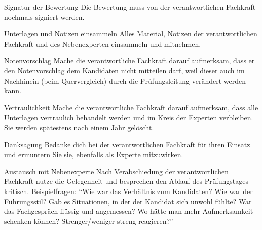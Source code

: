 \begin{taskitemwithoutcomment}{Signatur der Bewertung}
  Die Bewertung muss von der verantwortlichen Fachkraft nochmals signiert werden.
\end{taskitemwithoutcomment}
\begin{taskitemwithoutcomment}{Unterlagen und Notizen einsammeln}
  Alles Material, Notizen der verantwortlichen Fachkraft und des Nebenexperten einsammeln und mitnehmen.
\end{taskitemwithoutcomment}
\begin{taskitemwithoutcomment}{Notenvorschlag}
  Mache die verantwortliche Fachkraft darauf aufmerksam, dass er den Notenvorschlag dem Kandidaten nicht mitteilen darf, weil dieser auch im Nachhinein (beim Quervergleich) durch die Prüfungsleitung verändert werden kann.
\end{taskitemwithoutcomment}
\begin{taskitemwithoutcomment}{Vertraulichkeit}
  Mache die verantwortliche Fachkraft darauf aufmerksam, dass alle Unterlagen vertraulich behandelt werden und im Kreis der Experten verbleiben. Sie werden spätestens nach einem Jahr gelöscht.
\end{taskitemwithoutcomment}
\begin{taskitemwithoutcomment}{Danksagung}
  Bedanke dich bei der verantwortlichen Fachkraft für ihren Einsatz und ermuntern Sie sie, ebenfalls als Experte mitzuwirken.
\end{taskitemwithoutcomment}
\begin{taskitem}{Austausch mit Nebenexperte}
  Nach Verabschiedung der verantwortlichen Fachkraft nutze die Gelegenheit und besprechen den Ablauf des Prüfungstages kritisch. Beispielfragen: \enquote{Wie war das Verhältnis zum Kandidaten? Wie war der Führungsstil? Gab es Situationen, in der der Kandidat sich unwohl fühlte? War das Fachgespräch flüssig und angemessen? Wo hätte man mehr Aufmerksamkeit schenken können? Strenger/weniger streng reagieren?}
\end{taskitem}
